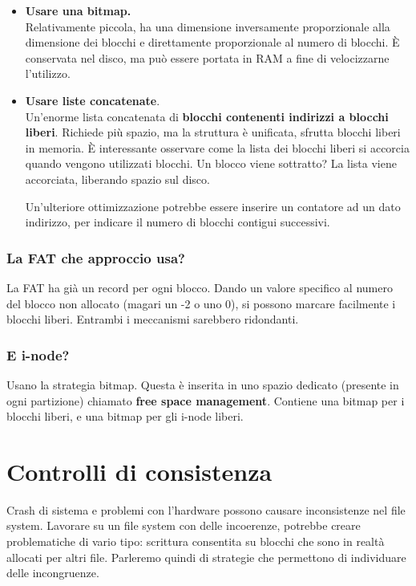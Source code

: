 \documentclass{report}
\begin{document}
\begin{itemize}
    \item \textbf{Usare una bitmap.}\\
    Relativamente piccola, ha una dimensione inversamente proporzionale alla dimensione dei blocchi e direttamente proporzionale al numero di blocchi. È conservata nel disco, ma può essere portata in RAM a fine di velocizzarne l'utilizzo.

    \item \textbf{Usare liste concatenate}.\\
    Un'enorme lista concatenata di \textbf{blocchi contenenti indirizzi a blocchi liberi}. Richiede più spazio, ma la struttura è unificata, sfrutta blocchi liberi in memoria. È interessante osservare come la lista dei blocchi liberi si accorcia quando vengono utilizzati blocchi. Un blocco viene sottratto? La lista viene accorciata, liberando spazio sul disco.

    Un'ulteriore ottimizzazione potrebbe essere inserire un contatore ad un dato indirizzo, per indicare il numero di blocchi contigui successivi.
\end{itemize}

\subsubsection{La FAT che approccio usa?}
La FAT ha già un record per ogni blocco. Dando un valore specifico al numero del blocco non allocato (magari un -2 o uno 0), si possono marcare facilmente i blocchi liberi. Entrambi i meccanismi sarebbero ridondanti.

\subsubsection{E i-node?}
Usano la strategia bitmap. Questa è inserita in uno spazio dedicato (presente in ogni partizione) chiamato \textbf{free space management}. Contiene una bitmap per i blocchi liberi, e una bitmap per gli i-node liberi.

\section{Controlli di consistenza}
Crash di sistema e problemi con l'hardware possono causare inconsistenze nel file system. Lavorare su un file system con delle incoerenze, potrebbe creare problematiche di vario tipo: scrittura consentita su blocchi che sono in realtà allocati per altri file. Parleremo quindi di strategie che permettono di individuare delle incongruenze.
\end{document}
